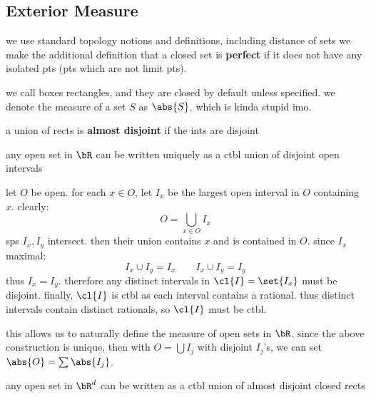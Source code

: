 \subsection{Exterior Measure}

we use standard topology notions and definitions, including distance of sets
we make the additional definition that a closed set is \textbf{perfect} if
it does not have any isolated pts (pts which are not limit pts).

we call boxes rectangles, and they are closed by default unless specified.
we denote the measure of a set $S$ as $\abs{S}$. which is kinda stupid imo.

\begin{defn}
    a union of rects is \textbf{almost disjoint} if the ints are disjoint
\end{defn}

\begin{prop}
    any open set in $\bR$ can be written uniquely as a ctbl union of disjoint
    open intervals
\end{prop}

\begin{pf}[source=Primary Source Material]
    let $O$ be open.
    for each $x\in O$, let $I_{x}$ be the largest open interval in $O$ containing
    $x$. clearly:
    \begin{equation*}
        O = \bigcup_{x\in O}I_{x}
    \end{equation*}
    sps $I_{x},I_{y}$ intersect.
    then their union contains $x$ and is contained in $O$.
    since $I_{x}$ maximal:
    \begin{equation*}
        I_{x}\cup I_{y}=I_{x} \qquad I_{x}\cup I_{y}=I_{y}
    \end{equation*}
    thus $I_{x}=I_{y}$.
    therefore any distinct intervals in $\cl{I}=\set{I_{x}}$ must be disjoint.
    finally, $\cl{I}$ is ctbl as each interval contains a rational.
    thus distinct intervals contain distinct rationals, so $\cl{I}$ must be ctbl.
\end{pf}

this allows us to naturally define the measure of open sets in $\bR$.
since the above construction is unique, then with $O=\bigcup I_{j}$ with disjoint
$I_{j}$'s, we can set $\abs{O}=\sum\abs{I_{j}}$.

\begin{prop}
    any open set in $\bR^{d}$ can be written as a ctbl union of almost disjoint
    closed rects
\end{prop}

